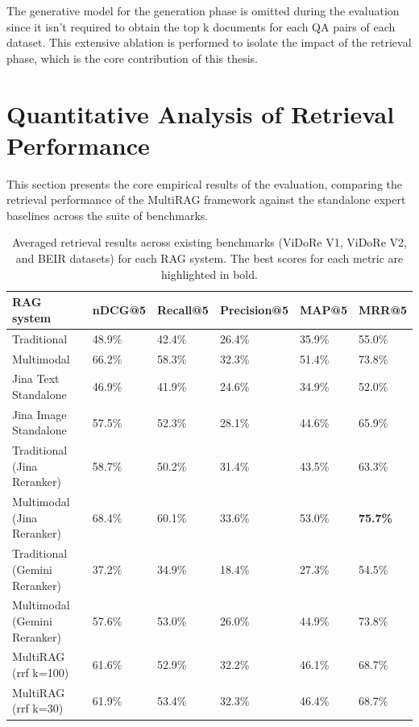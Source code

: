 \documentclass[12pt,twoside]{report}
\begin{document}
The generative model for the generation phase is omitted during the evaluation since it isn't required to obtain the top k documents for each QA pairs of each dataset. This extensive ablation is performed to isolate the impact of the retrieval phase, which is the core contribution of this thesis.

\section{Quantitative Analysis of Retrieval Performance}

This section presents the core empirical results of the evaluation, comparing the retrieval performance of the MultiRAG framework against the standalone expert baselines across the suite of benchmarks.

\begin{table}[tbhp]
  \centering
  \begingroup
  \footnotesize
  \setlength{\tabcolsep}{5pt}
  \renewcommand{\arraystretch}{1.25}
  \caption{Averaged retrieval results across existing benchmarks (ViDoRe V1, ViDoRe V2, and BEIR datasets) for each RAG system. The best scores for each metric are highlighted in bold.}
  \label{tab:overall_results}
  \begin{tabular}{|l|l|l|l|l|l|}
    \hline
    RAG system & nDCG@5 & Recall@5 & Precision@5 & MAP@5 & MRR@5 \\ \hline
    Traditional & 48.9\% & 42.4\% & 26.4\% & 35.9\% & 55.0\% \\ \hline
    Multimodal & 66.2\% & 58.3\% & 32.3\% & 51.4\% & 73.8\% \\ \hline \hline
    Jina Text Standalone & 46.9\% & 41.9\% & 24.6\% & 34.9\% & 52.0\% \\ \hline
    Jina Image Standalone & 57.5\% & 52.3\% & 28.1\% & 44.6\% & 65.9\% \\ \hline
    Traditional (Jina Reranker) & 58.7\% & 50.2\% & 31.4\% & 43.5\% & 63.3\% \\ \hline
    Multimodal (Jina Reranker) & 68.4\% & 60.1\% & 33.6\% & 53.0\% & \textbf{75.7\%} \\ \hline \hline
    Traditional (Gemini Reranker) & 37.2\% & 34.9\% & 18.4\% & 27.3\% & 54.5\% \\ \hline
    Multimodal (Gemini Reranker) & 57.6\% & 53.0\% & 26.0\% & 44.9\% & 73.8\% \\ \hline \hline
    MultiRAG (rrf k=100) & 61.6\% & 52.9\% & 32.2\% & 46.1\% & 68.7\% \\ \hline
    MultiRAG (rrf k=30) & 61.9\% & 53.4\% & 32.3\% & 46.4\% & 68.7\% \\ \hline

\end{tabular}
\end{table}
\end{document}
